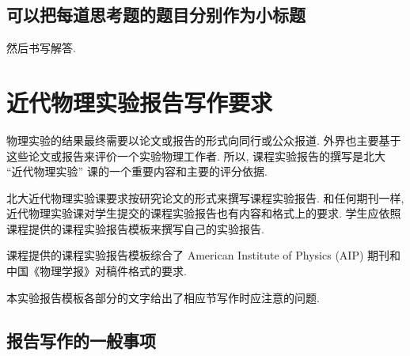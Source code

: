 \documentclass[font=default]{mpltx}
\begin{document}
\subsection{可以把每道思考题的题目分别作为小标题}
然后书写解答.

\section{近代物理实验报告写作要求}

物理实验的结果最终需要以论文或报告的形式向同行或公众报道.
外界也主要基于这些论文或报告来评价一个实验物理工作者.
所以, 课程实验报告的撰写是北大 ``近代物理实验'' 课的一个重要内容和主要的评分依据.

北大近代物理实验课要求按研究论文的形式来撰写课程实验报告.
和任何期刊一样, 近代物理实验课对学生提交的课程实验报告也有内容和格式上的要求.
学生应依照课程提供的课程实验报告模板来撰写自己的实验报告.

课程提供的课程实验报告模板综合了 American Institute of Physics (AIP) 期刊和中国《物理学报》对稿件格式的要求.

本实验报告模板各部分的文字给出了相应节写作时应注意的问题.

\subsection*{报告写作的一般事项}
\end{document}
